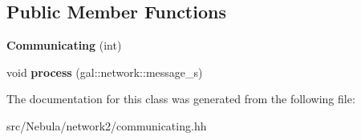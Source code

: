 \subsection*{\-Public \-Member \-Functions}
\begin{DoxyCompactItemize}
\item 
\hypertarget{classNeb_1_1Network_1_1Communicating_a49209dffa98203430d9c27d06bf2f20e}{{\bfseries \-Communicating} (int)}\label{classNeb_1_1Network_1_1Communicating_a49209dffa98203430d9c27d06bf2f20e}

\item 
\hypertarget{classNeb_1_1Network_1_1Communicating_accb7cece4006dabcb09bea96bd728175}{void {\bfseries process} (gal\-::network\-::message\-\_\-s)}\label{classNeb_1_1Network_1_1Communicating_accb7cece4006dabcb09bea96bd728175}

\end{DoxyCompactItemize}


\-The documentation for this class was generated from the following file\-:\begin{DoxyCompactItemize}
\item 
src/\-Nebula/network2/communicating.\-hh\end{DoxyCompactItemize}
